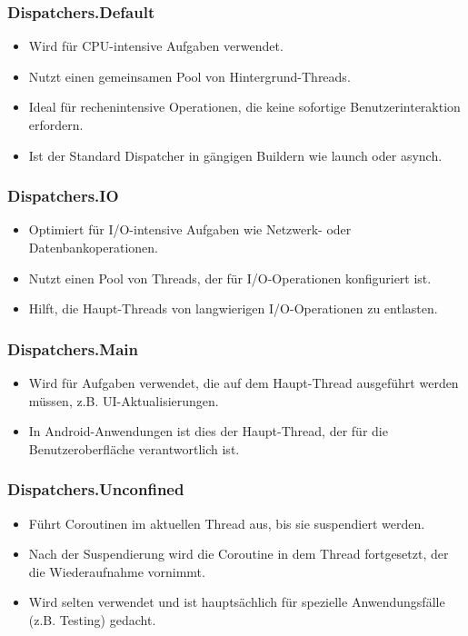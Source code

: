\documentclass[fontsize=12pt,paper=a4,twoside=semi,parskip=half-,headsepline,headinclude]{scrreprt}
\begin{document}
\subsubsection{Dispatchers.Default}

\begin{itemize}
	\item Wird für CPU-intensive Aufgaben verwendet.
	\item Nutzt einen gemeinsamen Pool von Hintergrund-Threads.
	\item Ideal für rechenintensive Operationen, die keine sofortige Benutzerinteraktion erfordern.
	\item Ist der Standard Dispatcher in gängigen Buildern wie launch oder asynch.
\end{itemize}


\subsubsection{Dispatchers.IO}

\begin{itemize}
	\item Optimiert für I/O-intensive Aufgaben wie Netzwerk- oder Datenbankoperationen.
	\item Nutzt einen Pool von Threads, der für I/O-Operationen konfiguriert ist.
	\item Hilft, die Haupt-Threads von langwierigen I/O-Operationen zu entlasten.
\end{itemize}

\subsubsection{Dispatchers.Main}

\begin{itemize}
	\item Wird für Aufgaben verwendet, die auf dem Haupt-Thread ausgeführt werden müssen, z.B. UI-Aktualisierungen.
	\item In Android-Anwendungen ist dies der Haupt-Thread, der für die Benutzeroberfläche verantwortlich ist.
\end{itemize}

\subsubsection{Dispatchers.Unconfined}

\begin{itemize}
	\item Führt Coroutinen im aktuellen Thread aus, bis sie suspendiert werden.
	\item Nach der Suspendierung wird die Coroutine in dem Thread fortgesetzt, der die Wiederaufnahme vornimmt.
	\item Wird selten verwendet und ist hauptsächlich für spezielle Anwendungsfälle (z.B. Testing) gedacht.
\end{itemize}
\end{document}
